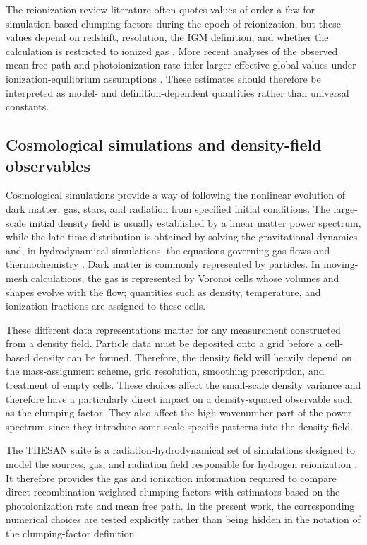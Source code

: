 The reionization review literature often quotes values of order a few for simulation-based clumping factors during the epoch of reionization, but these values depend on redshift, resolution, the IGM definition, and whether the calculation is restricted to ionized gas \cite{feng2019reionization}. More recent analyses of the observed mean free path and photoionization rate infer larger effective global values under ionization-equilibrium assumptions \cite{davies2024clumping}. These estimates should therefore be interpreted as model- and definition-dependent quantities rather than universal constants.

\subsection{Cosmological simulations and density-field observables}

Cosmological simulations provide a way of following the nonlinear evolution of dark matter, gas, stars, and radiation from specified initial conditions. The large-scale initial density field is usually established by a linear matter power spectrum, while the late-time distribution is obtained by solving the gravitational dynamics and, in hydrodynamical simulations, the equations governing gas flows and thermochemistry \cite{vogelsberger2019simulations}. Dark matter is commonly represented by particles. In moving-mesh calculations, the gas is represented by Voronoi cells whose volumes and shapes evolve with the flow; quantities such as density, temperature, and ionization fractions are assigned to these cells.

These different data representations matter for any measurement constructed from a density field. Particle data must be deposited onto a grid before a cell-based density can be formed. Therefore, the density field will heavily depend on the mass-assignment scheme, grid resolution, smoothing prescription, and treatment of empty cells. These choices affect the small-scale density variance and therefore have a particularly direct impact on a density-squared observable such as the clumping factor. They also affect the high-wavenumber part of the power spectrum since they introduce some scale-specific patterns into the density field.

The THESAN suite is a radiation-hydrodynamical set of simulations designed to model the sources, gas, and radiation field responsible for hydrogen reionization \cite{garaldi2022thesan}. It therefore provides the gas and ionization information required to compare direct recombination-weighted clumping factors with estimators based on the photoionization rate and mean free path. In the present work, the corresponding numerical choices are tested explicitly rather than being hidden in the notation of the clumping-factor definition.

